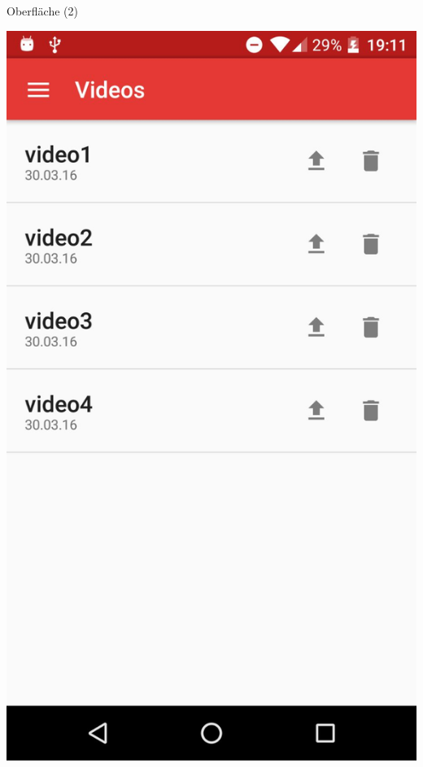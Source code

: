 \documentclass[19pt]{beamer}
\begin{document}
\begin{frame}{Oberfläche (2)}
\begin{center}
\includegraphics[scale=0.1]{resources/AppDemo.jpg}

\end{center}
\end{frame}
\end{document}
